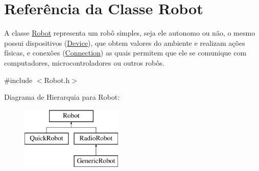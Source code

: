 \hypertarget{classRobot}{\section{Referência da Classe Robot}
\label{classRobot}
}


A classe \hyperlink{classRobot}{Robot} representa um robô simples, seja ele autonomo ou não, o mesmo possui dispositivos (\hyperlink{classDevice}{Device}), que obtem valores do ambiente e realizam ações físicas, e conexões (\hyperlink{classConnection}{Connection}) as quais permitem que ele se comunique com computadores, microcontroladores ou outros robôs.  




{\ttfamily \#include $<$Robot.\-h$>$}

Diagrama de Hierarquia para Robot\-:\begin{figure}[H]
\begin{center}
\leavevmode
\includegraphics[height=3.000000cm]{classRobot}
\end{center}
\end{figure}
